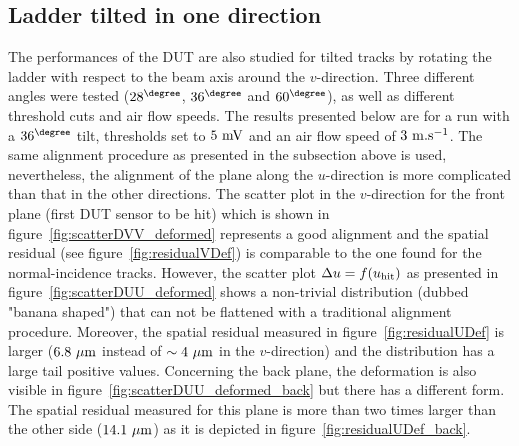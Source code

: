     \subsection{Ladder tilted in one direction}
    \label{subsec:deformation}

      The performances of the \gls{DUT} are also studied for tilted tracks by rotating the ladder with respect to the beam axis around the $v$-direction.
      Three different angles were tested ($28^{\degree}$, $36^{\degree}$ and $60^{\degree}$), as well as different threshold cuts and air flow speeds. 
      The results presented below are for a run with a $36^{\degree}$ tilt, thresholds set to $5~\rm{mV}$ and an air flow speed of $3~\rm{m.s}^{-1}$.
      The same alignment procedure as presented in the subsection above is used, nevertheless, the alignment of the plane along the $u$-direction is more complicated than that in the other directions.
      The scatter plot in the $v$-direction for the front plane (first \gls{DUT} sensor to be hit) which is shown in figure~\ref{fig:scatterDVV_deformed} represents a good alignment and the spatial residual (see figure~\ref{fig:residualVDef}) is comparable to the one found for the normal-incidence tracks.
      However, the scatter plot $\Delta u = f(u_{\rm{hit}})$ as presented in figure~\ref{fig:scatterDUU_deformed} shows a non-trivial distribution (dubbed "banana shaped") that can not be flattened with a traditional alignment procedure.
      Moreover, the spatial residual measured in figure~\ref{fig:residualUDef} is larger ($6.8~\rm{\mu m}$ instead of $\sim 4~\rm{\mu m}$ in the $v$-direction) and the distribution has a large tail  positive values.
      Concerning the back plane, the deformation is also visible in figure~\ref{fig:scatterDUU_deformed_back} but there has a different form.
      The spatial residual measured for this plane is more than two times larger than the other side ($14.1~\rm{\mu m}$) as it is depicted in figure~\ref{fig:residualUDef_back}.


